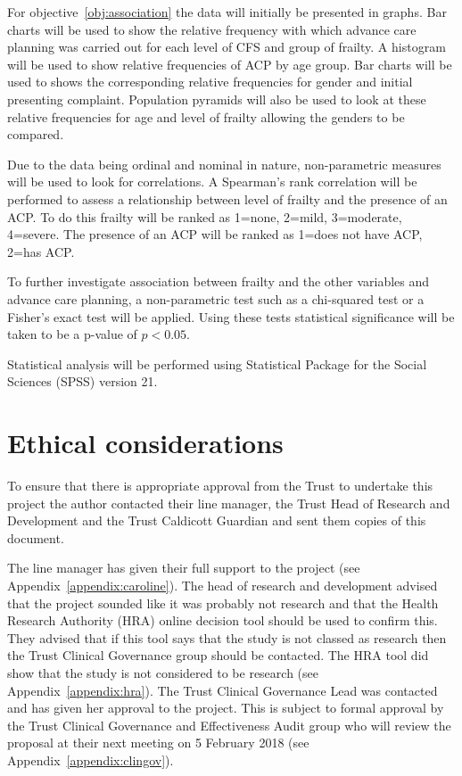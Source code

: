 \documentclass
[
	12pt,
	a4paper,
	oneside,
]{article}
\begin{document}
For objective~\ref{obj:association} the data will initially be presented in graphs.
Bar charts will be used to show the relative frequency with which advance care planning
was carried out for each level of CFS and group of frailty. A histogram will be 
used to show relative frequencies of ACP by age group. Bar charts 
will be used to shows the corresponding relative frequencies for gender and initial
presenting complaint. Population pyramids will also be used to look at these relative
frequencies for age and level of frailty allowing the genders to be compared.

Due to the data being ordinal and nominal in nature, non-parametric measures will
be used to look for correlations. A Spearman's rank correlation will be performed
to assess a relationship between level of frailty and the presence of an ACP. To do
this frailty will be ranked as 1=none, 2=mild, 3=moderate, 4=severe. The presence
of an ACP will be ranked as 1=does not have ACP, 2=has ACP.

To further investigate association between frailty and the other variables and advance
care planning, a non-parametric test such as a chi-squared test or a Fisher's exact
test will be applied. Using these tests statistical significance will be taken
to be a p-value of $p<0.05$.

Statistical analysis will be performed using Statistical Package for the Social 
Sciences (SPSS) version 21.

\section{Ethical considerations}

To ensure that there is appropriate approval from the Trust to undertake this project
the author contacted their line manager, the Trust Head of Research and Development and
the Trust Caldicott Guardian and sent them copies of this document. 

The line manager has given their full support to the project (see Appendix~\ref{appendix:caroline}).
The head of research and development
advised that the project sounded like it was probably not research and that 
the Health Research Authority (HRA) online decision tool should be used to confirm this.
They advised that if this tool says that the study is not classed as research then
the Trust Clinical Governance group should be contacted. The HRA tool did show
that the study is not considered to be research (see Appendix~\ref{appendix:hra}).
The Trust Clinical Governance Lead was contacted
and has given her approval to the project. This is subject to formal approval
by the Trust Clinical Governance and Effectiveness Audit group who will review 
the proposal at their next meeting on 5 February 2018 (see Appendix~\ref{appendix:clingov}).
\end{document}
